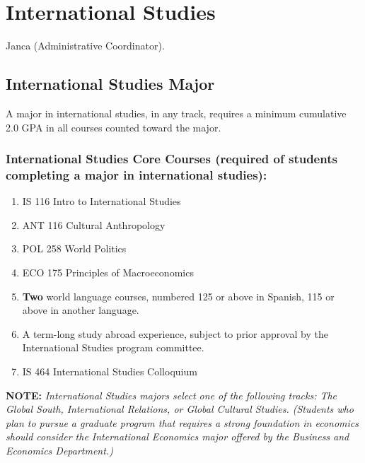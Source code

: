 \documentclass[
  letterpaper,
]{scrbook}
\providecommand{\tightlist}{%
  \setlength{\itemsep}{0pt}\setlength{\parskip}{0pt}}
\begin{document}
\section{International Studies}\label{international-studies}

Janca (Administrative Coordinator).

\subsection{International Studies
Major}\label{international-studies-major}

A major in international studies, in any track, requires a minimum
cumulative 2.0 GPA in all courses counted toward the major.

\subsubsection{International Studies Core Courses (required of students
completing a major in international
studies):}\label{international-studies-core-courses-required-of-students-completing-a-major-in-international-studies}

\begin{enumerate}
\def\labelenumi{\arabic{enumi}.}
\tightlist
\item
  IS 116 Intro to International Studies\\
\item
  ANT 116 Cultural Anthropology\\
\item
  POL 258 World Politics\\
\item
  ECO 175 Principles of Macroeconomics\\
\item
  \textbf{Two} world language courses, numbered 125 or above in Spanish,
  115 or above in another language.
\item
  A term-long study abroad experience, subject to prior approval by the
  International Studies program committee.
\item
  IS 464 International Studies Colloquium
\end{enumerate}

\textbf{NOTE:} \emph{International Studies majors select one of the
following tracks: The Global South, International Relations, or Global
Cultural Studies. (Students who plan to pursue a graduate program that
requires a strong foundation in economics should consider the
International Economics major offered by the Business and Economics
Department.)}
\end{document}
